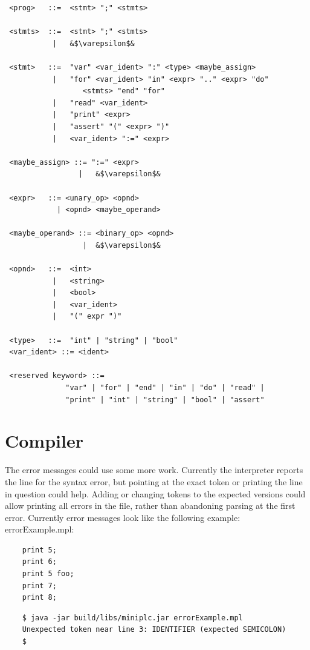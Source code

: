 \documentclass{article}
\begin{document}
\begin{verbatim}
 <prog>   ::=  <stmt> ";" <stmts>

 <stmts>  ::=  <stmt> ";" <stmts>
           |   &$\varepsilon$&

 <stmt>   ::=  "var" <var_ident> ":" <type> <maybe_assign>
           |   "for" <var_ident> "in" <expr> ".." <expr> "do"
                  <stmts> "end" "for"
           |   "read" <var_ident>
           |   "print" <expr>
           |   "assert" "(" <expr> ")"
           |   <var_ident> ":=" <expr>

 <maybe_assign> ::= ":=" <expr>
                 |   &$\varepsilon$&

 <expr>   ::= <unary_op> <opnd>
            | <opnd> <maybe_operand>

 <maybe_operand> ::= <binary_op> <opnd>
                  |  &$\varepsilon$&

 <opnd>   ::=  <int>
           |   <string>
           |   <bool>
           |   <var_ident>
           |   "(" expr ")"

 <type>   ::=  "int" | "string" | "bool"
 <var_ident> ::= <ident>

 <reserved keyword> ::=
              "var" | "for" | "end" | "in" | "do" | "read" |
              "print" | "int" | "string" | "bool" | "assert"
\end{verbatim}

\newpage
\section{Compiler}
The error messages could use some more work. Currently the interpreter reports
the line for the syntax error, but pointing at the exact token or printing the
line in question could help. Adding or changing tokens to the expected versions
could allow printing all errors in the file, rather than abandoning parsing at
the first error. Currently error messages look like the following example: \\[0.5em]
errorExample.mpl:
\begin{verbatim}
    print 5;
    print 6;
    print 5 foo;
    print 7;
    print 8;
\end{verbatim}
\begin{verbatim}
    $ java -jar build/libs/miniplc.jar errorExample.mpl
    Unexpected token near line 3: IDENTIFIER (expected SEMICOLON)
    $
\end{verbatim}
\end{document}
